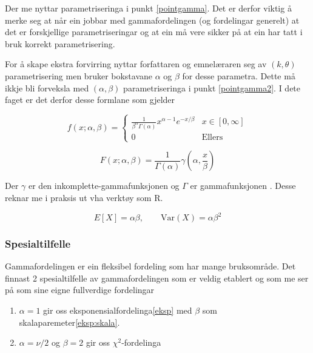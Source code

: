 Der me nyttar parametriseringa i punkt \ref{pointgamma}. Det er derfor viktig å merke seg at når ein jobbar med gammafordelingen (og fordelingar generelt) at det er forskjellige parametriseringar og at ein må vere sikker på at ein har tatt i bruk korrekt parametrisering.

For å skape ekstra forvirring nyttar forfattaren og emnelæraren seg av $(k, \theta)$ parametrisering men bruker bokstavane $\alpha$ og $\beta$ for desse parametra. Dette må ikkje bli forveksla med $(\alpha, \beta)$ parametriseringa i punkt \ref{pointgamma2}. I dete faget er det derfor desse formlane som gjelder

\begin{equation}
    f(x; \alpha, \beta) = 
    \begin{cases}
        \frac{1}{\beta^\alpha \Gamma(\alpha)}x^{\alpha - 1}e^{-x/\beta} & x \in [0, \infty] \\
        0 & \text{Ellers}
    \end{cases}
\end{equation}

\begin{equation}
    F(x; \alpha, \beta) = \frac{1}{\Gamma(\alpha)}\gamma\left(\alpha, \frac{x}{\beta}\right)
\end{equation}

Der $\gamma$ er den inkomplette-gammafunksjonen \cite{wiki:incomgamma} og $\Gamma$ er gammafunksjonen \cite{walpole2012probability}. Desse reknar me i praksis ut vha verktøy som R. 

\begin{equation}
    E[X] = \alpha\beta, \qquad \text{Var}(X) = \alpha\beta^2
\end{equation}

\subsubsection{Spesialtilfelle}

Gammafordelingen er ein fleksibel fordeling som har mange bruksområde. Det finnast 2 spesialtilfelle av gammafordelingen som er veldig etablert og som me ser på som sine eigne fullverdige fordelingar

\begin{enumerate}
    \item $\alpha = 1$ gir oss eksponensialfordelinga\ref{eksp} med $\beta$ som skalaparemeter\ref{eksp:skala}.
    \item $\alpha = \nu/2$ og $\beta = 2$ gir oss $\chi^2$-fordelinga
\end{enumerate}

